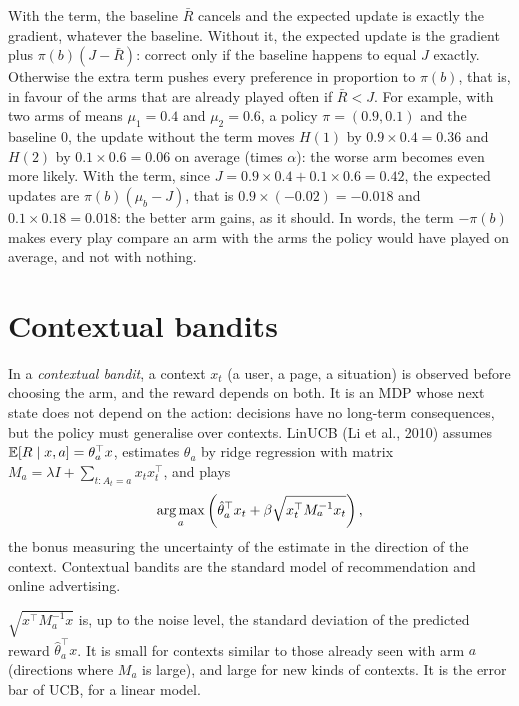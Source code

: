 With the term, the baseline $\bar R$ cancels and the expected update is
exactly the gradient, whatever the baseline. Without it, the expected
update is the gradient plus $\pi(b) (J - \bar R)$: correct only if the
baseline happens to equal $J$ exactly. Otherwise the extra term pushes
every preference in proportion to $\pi(b)$, that is, in favour of the arms
that are already played often if $\bar R < J$. For example, with two
arms of means $\mu_1 = 0.4$ and $\mu_2 = 0.6$, a policy $\pi = (0.9,
0.1)$ and the baseline $0$, the update without the term moves $H(1)$ by
$0.9 \times 0.4 = 0.36$ and $H(2)$ by $0.1 \times 0.6 = 0.06$ on average
(times $\alpha$): the worse arm becomes even more likely. With the term,
since $J = 0.9 \times 0.4 + 0.1 \times 0.6 = 0.42$, the expected updates
are $\pi(b) (\mu_b - J)$, that is $0.9 \times (-0.02) = -0.018$ and $0.1
\times 0.18 = 0.018$: the better arm gains, as it should. In words, the
term $-\pi(b)$ makes every play compare an arm with the arms the policy
would have played on average, and not with nothing.

\section{Contextual bandits}
\label{sec:contextual}

In a \emph{contextual bandit}, a context $x_t$ (a user, a page, a
situation) is observed before choosing the arm, and the reward depends on
both. It is an MDP whose next state does not depend on the action:
decisions have no long-term consequences, but the policy must generalise
over contexts. LinUCB (Li et al., 2010) assumes $\mathbb{E}[R \mid x, a] =
\theta_a^\top x$, estimates $\theta_a$ by ridge regression with matrix
$M_a = \lambda I + \sum_{t : A_t = a} x_t x_t^\top$, and plays
\begin{equation}
  \operatorname*{arg\,max}_a \left( \hat\theta_a^\top x_t + \beta \sqrt{x_t^\top M_a^{-1}
  x_t} \right),
\end{equation}
the bonus measuring the uncertainty of the estimate in the direction of the
context. Contextual bandits are the standard model of recommendation and
online advertising.

\begin{intuition}
  $\sqrt{x^\top M_a^{-1} x}$ is, up to the noise level, the standard
  deviation of the predicted reward $\hat\theta_a^\top x$. It is small for
  contexts similar to those already seen with arm $a$ (directions where
  $M_a$ is large), and large for new kinds of contexts. It is the error bar
  of UCB, for a linear model.
\end{intuition}

